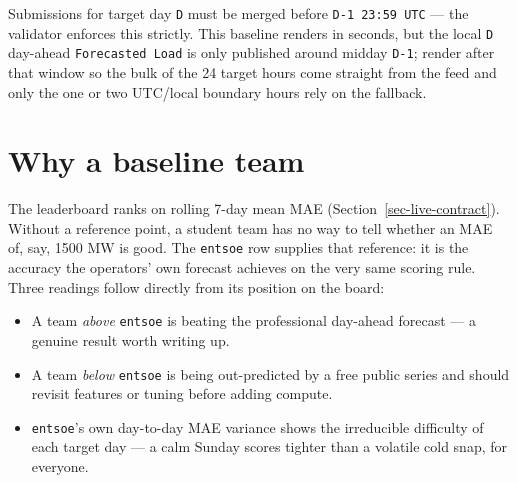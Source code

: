 \documentclass[
  english,
  letterpaper,
]{scrbook}
\providecommand{\tightlist}{%
  \setlength{\itemsep}{0pt}\setlength{\parskip}{0pt}}
\begin{document}
\begin{tcolorbox}[enhanced jigsaw, arc=.35mm, bottomrule=.15mm, bottomtitle=1mm, breakable, colback=white, colbacktitle=quarto-callout-warning-color!10!white, colframe=quarto-callout-warning-color-frame, coltitle=black, left=2mm, leftrule=.75mm, opacityback=0, opacitybacktitle=0.6, rightrule=.15mm, title=\textcolor{quarto-callout-warning-color}{\faExclamationTriangle}\hspace{0.5em}{Deadline}, titlerule=0mm, toprule=.15mm, toptitle=1mm]

Submissions for target day \texttt{D} must be merged before
\texttt{D-1\ 23:59\ UTC} --- the validator enforces this strictly. This
baseline renders in seconds, but the local \texttt{D} day-ahead
\texttt{Forecasted\ Load} is only published around midday \texttt{D-1};
render after that window so the bulk of the 24 target hours come
straight from the feed and only the one or two UTC/local boundary hours
rely on the fallback.

\end{tcolorbox}

\section{Why a baseline team}\label{sec-entsoe-why}

The leaderboard ranks on rolling 7-day mean MAE
(Section~\ref{sec-live-contract}). Without a reference point, a student
team has no way to tell whether an MAE of, say, 1500 MW is good. The
\texttt{entsoe} row supplies that reference: it is the accuracy the
operators' own forecast achieves on the very same scoring rule. Three
readings follow directly from its position on the board:

\begin{itemize}
\tightlist
\item
  A team \emph{above} \texttt{entsoe} is beating the professional
  day-ahead forecast --- a genuine result worth writing up.
\item
  A team \emph{below} \texttt{entsoe} is being out-predicted by a free
  public series and should revisit features or tuning before adding
  compute.
\item
  \texttt{entsoe}'s own day-to-day MAE variance shows the irreducible
  difficulty of each target day --- a calm Sunday scores tighter than a
  volatile cold snap, for everyone.
\end{itemize}
\end{document}
